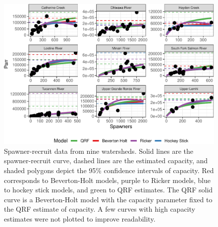\documentclass[
  12pt,
]{article}
\begin{document}
\newpage

\begin{figure}
\centering
\includegraphics{figures/sr-figure-1.pdf}
\caption{\label{fig:sr-figure}Spawner-recruit data from nine watersheds. Solid lines are the spawner-recruit curve, dashed lines are the estimated capacity, and shaded polygons depict the 95\% confidence intervals of capacity. Red corresponds to Beverton-Holt models, purple to Ricker models, blue to hockey stick models, and green to QRF estimates. The QRF solid curve is a Beverton-Holt model with the capacity parameter fixed to the QRF estimate of capacity. A few curves with high capacity estimates were not plotted to improve readability.}
\end{figure}
\end{document}
